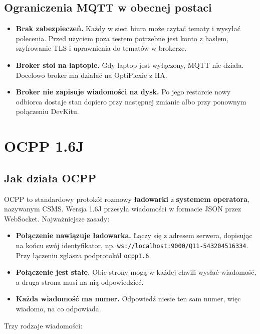 \documentclass[11pt,a4paper]{article}
\begin{document}
\subsection{Ograniczenia MQTT w obecnej postaci}

\begin{itemize}
\item \textbf{Brak zabezpieczeń.} Każdy w sieci biura może czytać tematy i wysyłać polecenia. Przed użyciem poza testem potrzebne jest konto z hasłem, szyfrowanie TLS i uprawnienia do tematów w brokerze.
\item \textbf{Broker stoi na laptopie.} Gdy laptop jest wyłączony, MQTT nie działa. Docelowo broker ma działać na OptiPlexie z HA.
\item \textbf{Broker nie zapisuje wiadomości na dysk.} Po jego restarcie nowy odbiorca dostaje stan dopiero przy następnej zmianie albo przy ponownym połączeniu DevKitu.
\end{itemize}

\clearpage

\section{OCPP 1.6J}

\subsection{Jak działa OCPP}

OCPP to standardowy protokół rozmowy \textbf{ładowarki} z \textbf{systemem operatora}, nazywanym CSMS. Wersja 1.6J przesyła wiadomości w formacie JSON przez WebSocket. Najważniejsze zasady:

\begin{itemize}
\item \textbf{Połączenie nawiązuje ładowarka.} Łączy się z adresem serwera, dopisując na końcu swój identyfikator, np. \texttt{ws:\allowbreak{}/\allowbreak{}/\allowbreak{}localhost:\allowbreak{}9000/\allowbreak{}Q11-\allowbreak{}543204516334}. Przy łączeniu zgłasza podprotokół \texttt{ocpp1.6}.
\item \textbf{Połączenie jest stałe.} Obie strony mogą w każdej chwili wysłać wiadomość, a druga strona musi na nią odpowiedzieć.
\item \textbf{Każda wiadomość ma numer.} Odpowiedź niesie ten sam numer, więc wiadomo, na co odpowiada.
\end{itemize}

Trzy rodzaje wiadomości:
\end{document}
